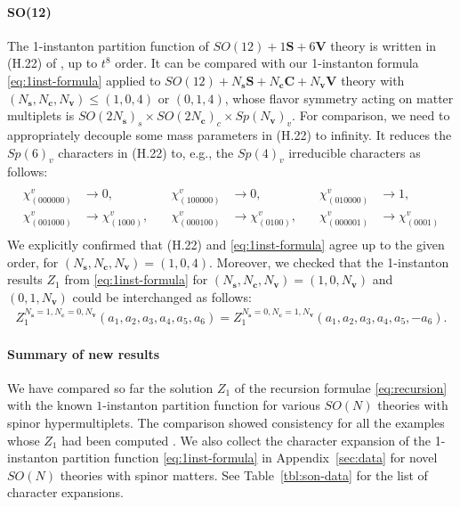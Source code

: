 \documentclass[letterpaper, 11pt]{article}
\begin{document}
{\paragraph{SO(12)}

The 1-instanton partition function of $SO(12) + 1\mathbf{S} + 6\mathbf{V}$ theory  is written in (H.22) of \cite{DelZotto:2018tcj}, up to $t^8$ order. It can be compared with our 1-instanton formula \eqref{eq:1inst-formula} applied to $SO(12) + N_\mathbf{s}\mathbf{S} + N_\mathbf{c}\mathbf{C} + N_\mathbf{v}\mathbf{V}$ theory with $(N_\mathbf{s},N_\mathbf{c}, N_{\mathbf{v}}) \leq (1,0,4)$ or $(0,1,4)$, whose flavor symmetry acting on matter multiplets is $SO(2N_\mathbf{s})_s \times SO(2N_\mathbf{c})_c \times Sp(N_\mathbf{v})_v$. For comparison, we need to appropriately decouple some mass parameters in (H.22) to infinity. It reduces the $Sp(6)_v$ characters in (H.22) to, e.g., the $Sp(4)_v$ irreducible characters as follows:
\begin{align}
\begin{split}
\begin{array}{llllll}
  \chi^{v}_{(000000)} &\rightarrow 0, & \quad \chi^{v}_{(100000)}&\rightarrow 0,& \quad \chi^{v}_{(010000)}&\rightarrow 1, \\ \chi^{v}_{(001000)}&\rightarrow \chi^{v}_{(1000)}, & \quad  \chi^{v}_{(000100)}&\rightarrow \chi^{v}_{(0100)}, & \quad \chi^{v}_{(000001)}&\rightarrow \chi^{v}_{(0001)}
\end{array}
\end{split}
\end{align}
We explicitly confirmed that (H.22) and \eqref{eq:1inst-formula} agree up to the given order, for $(N_\mathbf{s},N_\mathbf{c}, N_{\mathbf{v}}) = (1,0,4)$. Moreover, we checked that the 1-instanton results ${Z}_1$ from \eqref{eq:1inst-formula} for $(N_\mathbf{s},N_\mathbf{c}, N_{\mathbf{v}})= (1,0,N_\mathbf{v})$ and $(0,1,N_\mathbf{v})$ could be interchanged as follows: 
\begin{align}
Z_{1}^{N_{\mathbf{s}}=1,N_\mathbf{c}=0,N_{\mathbf{v}}}(a_1,a_2,a_3,a_4,a_5,a_6) =Z_{1}^{N_{\mathbf{s}}=0,N_\mathbf{c}=1,N_{\mathbf{v}}}(a_1,a_2,a_3,a_4,a_5,-a_6).
\end{align}


\paragraph{Summary of new results}
We have compared so far the solution $Z_1$ of the recursion formulae \eqref{eq:recursion} with the known $1$-instanton partition function for various $SO(N)$ theories with spinor hypermultiplets. The comparison showed consistency for all the examples whose $Z_1$ had been computed \cite{Kim:2018gjo,DelZotto:2018tcj}. We also collect the character expansion of the 1-instanton partition function \eqref{eq:1inst-formula} in Appendix~\ref{sec:data} for novel $SO(N)$ theories with spinor matters. See Table~\ref{tbl:son-data} for the list of character expansions.


}
\end{document}
